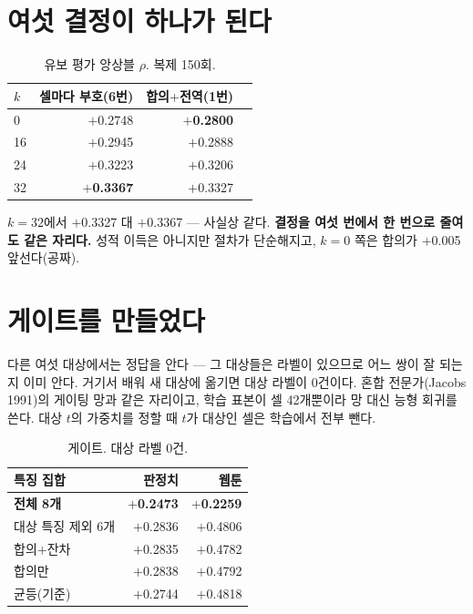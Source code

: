 \documentclass[10pt]{article}
\begin{document}

\section{여섯 결정이 하나가 된다}

\begin{table}[t]
\centering\tsize
\caption{유보 평가 앙상블 $\rho$. 복제 150회.}
\begin{tabular}{lrrr}
\toprule
$k$ & 셀마다 부호(6번) & 합의$+$전역(1번) \\
\midrule
0 & $+$0.2748 & \textbf{$+$0.2800} \\
16 & $+$0.2945 & $+$0.2888 \\
24 & $+$0.3223 & $+$0.3206 \\
32 & \textbf{$+$0.3367} & $+$0.3327 \\
\bottomrule
\end{tabular}
\end{table}

$k{=}32$에서 $+$0.3327 대 $+$0.3367 --- 사실상 같다. \textbf{결정을 여섯 번에서
한 번으로 줄여도 같은 자리다.} 성적 이득은 아니지만 절차가 단순해지고, $k{=}0$
쪽은 합의가 $+$0.005 앞선다(공짜).

\section{게이트를 만들었다}

다른 여섯 대상에서는 정답을 안다 --- 그 대상들은 라벨이 있으므로 어느 쌍이
잘 되는지 이미 안다. 거기서 배워 새 대상에 옮기면 대상 라벨이 0건이다.
혼합 전문가(Jacobs 1991)의 게이팅 망과 같은 자리이고, 학습 표본이 셀 42개뿐이라
망 대신 능형 회귀를 쓴다. 대상 $t$의 가중치를 정할 때 $t$가 대상인 셀은 학습에서
전부 뺀다.

\begin{table}[t]
\centering\tsize
\caption{게이트. 대상 라벨 0건.}
\begin{tabular}{lrr}
\toprule
특징 집합 & 판정치 & 웹툰 \\
\midrule
\textbf{전체 8개} & \textbf{$+$0.2473} & \textbf{$+$0.2259} \\
대상 특징 제외 6개 & $+$0.2836 & $+$0.4806 \\
합의$+$잔차 & $+$0.2835 & $+$0.4782 \\
합의만 & $+$0.2838 & $+$0.4792 \\
\midrule
균등(기준) & $+$0.2744 & $+$0.4818 \\
\bottomrule
\end{tabular}
\end{table}
\end{document}
